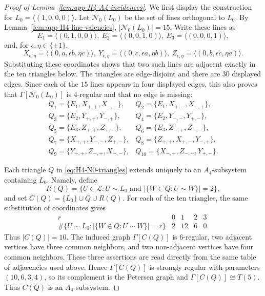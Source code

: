 \documentclass[11pt]{article}
\theoremstyle{definition}
\begin{document}
\begin{proof}[Proof of Lemma~\ref{lem:app-H4-A4-incidences}]
We first display the construction for
\(L_{0}=\langle(1,0,0,0)\rangle\).  Let \(\mathcal N_{0}(L_{0})\) be the
set of lines orthogonal to \(L_{0}\).  By
Lemma~\ref{lem:app-H4-line-valencies},
\(|\mathcal N_{0}(L_{0})|=15\).  Write these lines as
\[
    E_{1}=\langle(0,1,0,0)\rangle,\ 
    E_{2}=\langle(0,0,1,0)\rangle,\ 
    E_{3}=\langle(0,0,0,1)\rangle,
\]
and, for \(\epsilon,\eta\in\{\pm1\}\),
\[
    X_{\epsilon,\eta}=\langle(0,a,\epsilon b,\eta c)\rangle,\ 
    Y_{\epsilon,\eta}=\langle(0,c,\epsilon a,\eta b)\rangle,\ 
    Z_{\epsilon,\eta}=\langle(0,b,\epsilon c,\eta a)\rangle.
\]
Substituting these coordinates shows that two such lines are adjacent
exactly in the ten triangles below.  The triangles are edge-disjoint and
there are \(30\) displayed edges.  Since each of the \(15\) lines appears
in four displayed edges, this also proves that
\(\Gamma[\mathcal N_{0}(L_{0})]\) is \(4\)-regular and that no edge is missing:
\begin{equation}\label{eq:H4-N0-triangles}
\begin{array}{lll}
Q_{1}=\{E_{1},X_{+,+},X_{-,-}\},&
Q_{2}=\{E_{1},X_{+,-},X_{-,+}\},\\
Q_{3}=\{E_{2},Y_{+,+},Y_{-,+}\},&
Q_{4}=\{E_{2},Y_{-,-},Y_{+,-}\},\\
Q_{5}=\{E_{3},Z_{+,+},Z_{+,-}\},&
Q_{6}=\{E_{3},Z_{-,+},Z_{-,-}\},\\
Q_{7}=\{X_{+,+},Y_{-,-},Z_{+,-}\},&
Q_{8}=\{Z_{+,+},X_{+,-},Y_{-,+}\},\\
Q_{9}=\{Y_{+,+},Z_{-,+},X_{-,-}\},&
Q_{10}=\{X_{-,+},Z_{-,-},Y_{+,-}\}.
\end{array}
\end{equation}

Each triangle \(Q\) in \eqref{eq:H4-N0-triangles} extends uniquely to an
\(A_{4}\)-subsystem containing \(L_{0}\).  Namely, define
\[
    R(Q)=\{U\in\mathcal L:U\sim L_{0}
    \text{ and }|\{W\in Q:U\sim W\}|=2\},
\]
and set \(C(Q)=\{L_{0}\}\cup Q\cup R(Q)\).  For each of the ten triangles,
the same substitution of coordinates gives
\begin{equation}\label{eq:H4-extension-count}
\begin{array}{c|cccc}
r&0&1&2&3\\
\hline
\#\{U\sim L_{0}:|\{W\in Q:U\sim W\}|=r\}
&2&12&6&0 .
\end{array}
\end{equation}
Thus \(|C(Q)|=10\).  The induced graph \(\Gamma[C(Q)]\) is \(6\)-regular,
two adjacent vertices have three common neighbors, and two non-adjacent
vertices have four common neighbors.  These three assertions are read
directly from the same table of adjacencies used above.  Hence
\(\Gamma[C(Q)]\) is strongly regular with parameters \((10,6,3,4)\), so its
complement is the Petersen graph and \(\Gamma[C(Q)]\cong T(5)\).  Thus
\(C(Q)\) is an \(A_{4}\)-subsystem.


\end{proof}
\end{document}
